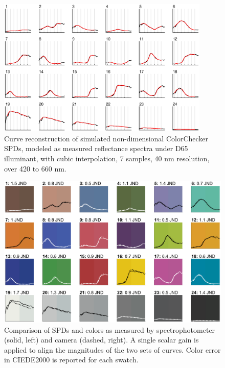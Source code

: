 \documentclass[twocolumn,10pt]{asme2ej}
\begin{document}
\begin{figure}[H]
\begin{centering}
\includegraphics[width=0.90\textwidth]{colorchecker_reconstruction.eps}
\caption{Curve reconstruction of simulated non-dimensional ColorChecker SPDs, modeled as measured reflectance spectra under D65 illuminant, with cubic interpolation, 7 samples, 40 nm resolution, over 420 to 660 nm.}
\label{colorchecker_reconstruction}
\end{centering}
\end{figure}

\begin{figure}[H]
\centering
  \includegraphics[width=0.90\linewidth]{SPD_validation.eps}
  \caption{Comparison of SPDs and colors as measured by spectrophotometer (solid, left) and camera (dashed, right). A single scalar gain is applied to align the magnitudes of the two sets of curves. Color error in CIEDE2000 is reported for each swatch.}
  \label{SPD_validation}
\end{figure}
\end{document}
